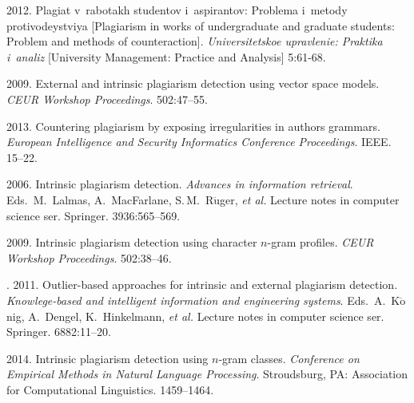   \begin{multicols}{2}

\renewcommand{\bibname}{\protect\rmfamily References}

{\small\frenchspacing
 {%
 \begin{thebibliography}{99}

2012. Plagiat v~rabotakh studentov i~aspirantov: 
Problema i~metody protivodeystviya [Plagiarism in works of undergraduate 
and graduate students: Problem and methods of counteraction]. 
\textit{Universitetskoe upravlenie: Praktika i~analiz} 
[University Management: Practice and Analysis] 5:61-68.

 2009. 
External and intrinsic plagiarism detection using vector space models. 
\textit{CEUR Workshop Proceedings}.
 502:47--55.

 2013. 
Countering pla\-gi\-arism by exposing irregularities in authors grammars. 
\textit{European Intelligence and Security Informatics Conference 
 Proceedings}. IEEE. 15--22.




 2006. 
Intrinsic plagiarism detection. 
\textit{Advances in information retrieval}.
Eds.\ M.~Lalmas, A.~MacFarlane, 
S.\,M.~R$\ddot{\mbox{u}}$ger,
\textit{et al.}
Lecture notes in computer science ser. Springer. 3936:565--569.

 2009. 
Intrinsic plagiarism detection using character $n$-gram profiles. 
\textit{CEUR Workshop Proceedings}. 
502:38--46.

. 2011. 
Outlier-based approaches for intrinsic and external plagiarism detection. 
\textit{Knowlege-based and intelligent information and engineering systems}.
Eds.\ A.~K$\ddot{\mbox{o}}$nig, A.~Dengel, K.~Hinkelmann, \textit{et al.}
Lecture notes in computer science ser. Springer. 6882:11--20.

 2014. 
Intrinsic plagiarism detection using $n$-gram classes. 
\textit{Conference on Empirical Methods in Natural Language Processing}.
 Stroudsburg, PA: Association for Computational Linguistics. 1459--1464.


\end{thebibliography}}}
\end{multicols}

